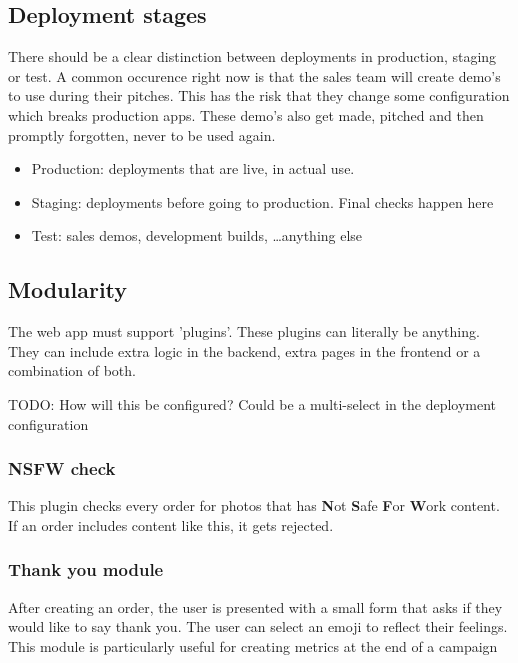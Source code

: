 \subsection{Deployment stages}

There should be a clear distinction between deployments in production, staging or test. 
A common occurence right now is that the sales team will create demo's to use during their pitches. This has the risk that they change some configuration which breaks production apps. These demo's also get made, pitched and then promptly forgotten, never to be used again.

\begin{itemize}
	\item Production: deployments that are live, in actual use.
	\item Staging: deployments before going to production. Final checks happen here
	\item Test: sales demos, development builds, \dots anything else
\end{itemize}

\subsection{Modularity}

The web app must support 'plugins'. These plugins can literally be anything. They can include extra logic in the backend, extra pages in the frontend or a combination of both.

TODO: How will this be configured? Could be a multi-select in the deployment configuration

\subsubsection{NSFW check}

This plugin checks every order for photos that has \textbf{N}ot \textbf{S}afe \textbf{F}or \textbf{W}ork content. If an order includes content like this, it gets rejected.

\subsubsection{Thank you module}

After creating an order, the user is presented with a small form that asks if they would like to say thank you. The user can select an emoji to reflect their feelings. 
This module is particularly useful for creating metrics at the end of a campaign

